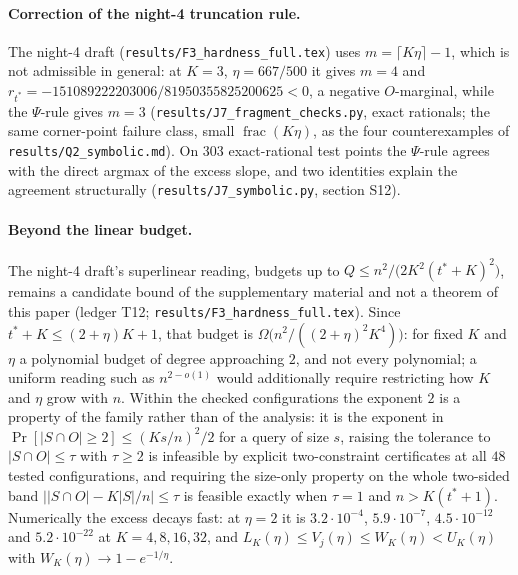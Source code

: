 \paragraph{Correction of the night-4 truncation rule.}
The night-4 draft (\texttt{results/F3\_hardness\_full.tex}) uses
$m=\lceil K\eta\rceil-1$, which is not admissible in general: at $K=3$,
$\eta=667/500$ it gives $m=4$ and
$r_{t^{\ast}}=-151089222203006/81950355825200625<0$, a negative
$O$-marginal, while the $\Psi$-rule gives $m=3$
(\texttt{results/J7\_fragment\_checks.py}, exact rationals; the same
corner-point failure class, small $\operatorname{frac}(K\eta)$, as the
four counterexamples of \texttt{results/Q2\_symbolic.md}).  On $303$
exact-rational test points the $\Psi$-rule agrees with the direct argmax
of the excess slope, and two identities explain the agreement
structurally (\texttt{results/J7\_symbolic.py}, section S12).
\paragraph{Beyond the linear budget.}
The night-4 draft's superlinear reading, budgets up to
$Q\le n^{2}/\bigl(2K^{2}(t^{\ast}+K)^{2}\bigr)$, remains a candidate
bound of the supplementary material and not a theorem of this paper
(ledger T12; \texttt{results/F3\_hardness\_full.tex}).  Since
$t^{\ast}+K\le(2+\eta)K+1$, that budget is
$\Omega\bigl(n^{2}/((2+\eta)^{2}K^{4})\bigr)$: for fixed $K$ and $\eta$ a
polynomial budget of degree approaching $2$, and not every polynomial;
a uniform reading such as $n^{2-o(1)}$ would additionally require
restricting how $K$ and $\eta$ grow with $n$.  Within the checked
configurations the exponent $2$ is a property of the family rather than
of the analysis: it is the exponent in
$\Pr[|S\cap O|\ge2]\le(Ks/n)^{2}/2$ for a query of size $s$, raising the
tolerance to $|S\cap O|\le\tau$ with $\tau\ge2$ is infeasible by explicit
two-constraint certificates at all $48$ tested configurations, and
requiring the size-only property on the whole two-sided band
$\bigl||S\cap O|-K|S|/n\bigr|\le\tau$ is feasible exactly when $\tau=1$
and $n>K(t^{\ast}+1)$.  Numerically the excess decays fast: at $\eta=2$
it is $3.2\cdot10^{-4}$, $5.9\cdot10^{-7}$, $4.5\cdot10^{-12}$ and
$5.2\cdot10^{-22}$ at $K=4,8,16,32$, and
$L_K(\eta)\le V_j(\eta)\le W_K(\eta)<U_K(\eta)$ with
$W_K(\eta)\to1-e^{-1/\eta}$.

